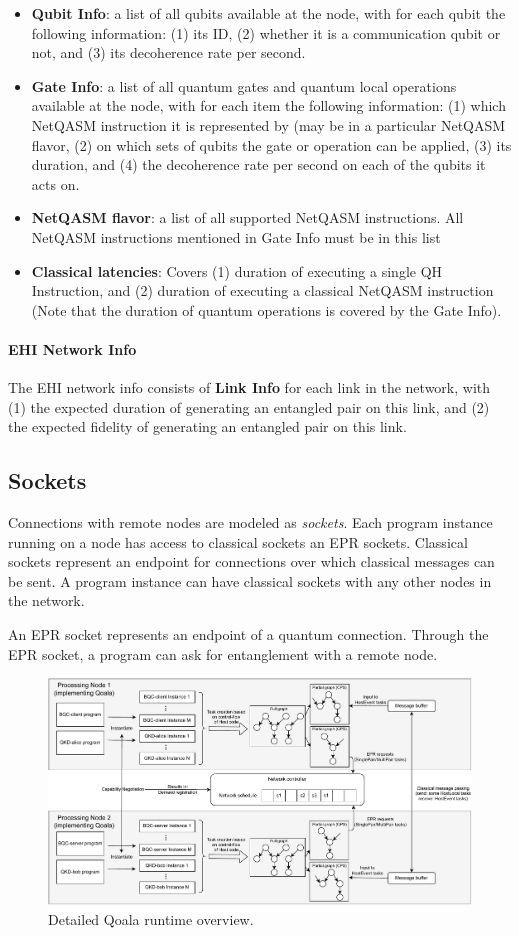 \begin{itemize}
\item \textbf{Qubit Info}: a list of all qubits available at the node, with for each qubit the following information: 
(1) its ID,
(2) whether it is a communication qubit or not, and
(3) its decoherence rate per second.
\item \textbf{Gate Info}: a list of all quantum gates and quantum local operations available at the node, with for each item the following information:
(1) which NetQASM instruction it is represented by (may be in a particular NetQASM flavor,
(2) on which sets of qubits the gate or operation can be applied,
(3) its duration, and
(4) the decoherence rate per second on each of the qubits it acts on.

\item \textbf{NetQASM flavor}: a list of all supported NetQASM instructions. All NetQASM instructions mentioned in Gate Info must be in this list

\item \textbf{Classical latencies}:
Covers
(1) duration of executing a single QH Instruction, and
(2) duration of executing a classical NetQASM instruction (Note that the duration of quantum operations is covered by the Gate Info).
\end{itemize}

\paragraph{EHI Network Info}
The EHI network info consists of \textbf{Link Info} for each link in the network, with
(1) the expected duration of generating an entangled pair on this link, and
(2) the expected fidelity of generating an entangled pair on this link.



\subsection{Sockets}
Connections with remote nodes are modeled as \textit{sockets}.
Each program instance running on a node has access to classical sockets an EPR sockets.
Classical sockets represent an endpoint for connections over which classical messages can be sent.
A program instance can have classical sockets with any other nodes in the network.

An EPR socket represents an endpoint of a quantum connection.
Through the EPR socket, a program can ask for entanglement with a remote node.


\begin{figure}
    \centering
    \includegraphics[width=\textwidth]{figures/qoala/runtime_detailed.pdf}
    \caption{Detailed Qoala runtime overview.}
    \label{qoala:fig:app:runtime_detailed}
\end{figure}

